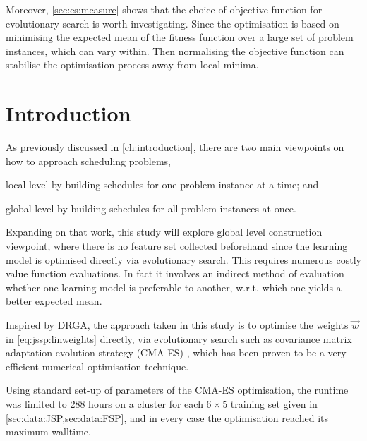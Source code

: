 Moreover, \cref{sec:es:measure} shows that the choice of objective function  for evolutionary search is worth investigating. Since the optimisation is based on minimising the expected mean of the fitness function over a large set of problem instances, which can vary within. Then normalising the objective function can stabilise the optimisation process away from local minima. 

\section{Introduction}
As previously discussed in \cref{ch:introduction}, there are two main viewpoints on how to approach scheduling problems,
\begin{inparaenum} 
\item local level by building schedules for one problem instance at a time;
and \item global level by building schedules for all problem instances at once.
\end{inparaenum}
 Expanding on that  work, this study will explore global level construction viewpoint, where there is no feature set collected beforehand since the learning model is optimised directly via evolutionary search. This requires numerous costly value function evaluations. In fact it involves an indirect method of evaluation whether one learning model is preferable to another, w.r.t. which one yields a better expected mean. 



Inspired by DRGA, the approach taken in this study is to optimise the weights $\vec{w}$ in \cref{eq:jssp:linweights} directly, via evolutionary search such as covariance matrix adaptation evolution strategy (CMA-ES) \cite{Hansen01}, which has been proven to be a very efficient numerical optimisation technique. 

Using standard set-up of parameters of the CMA-ES optimisation, the runtime was limited to 288 hours on a cluster for each $6\times5$ training set given in \cref{sec:data:JSP,sec:data:FSP}, and in every case the optimisation reached its maximum walltime.

